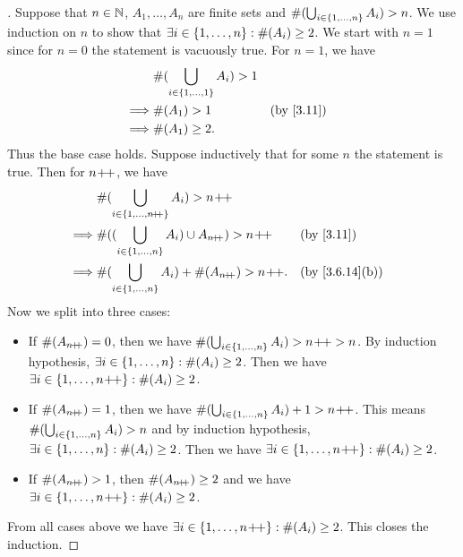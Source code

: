 \begin{proof}[]
	Suppose that \(n \in \mathbb{N}\), \(A_1, \dots, A_n\) are finite sets and \(\#(\bigcup_{i \in \left\lbrace1, \dots, n\right\rbrace} A_i) > n\).
	We use induction on \(n\) to show that \(\exists i \in \left\lbrace1, \dots, n\right\rbrace : \#(A_i) \geq 2\).
	We start with \(n = 1\) since for \(n = 0\) the statement is vacuously true.
	For \(n = 1\), we have
	\begin{align*}
		         & \#(\bigcup_{i \in \set{1, \dots, 1}} A_i) > 1                \\
		\implies & \#(A_1) > 1                                   &  & \by{3.11} \\
		\implies & \#(A_1) \geq 2.
	\end{align*}
	Thus the base case holds.
	Suppose inductively that for some \(n\) the statement is true.
	Then for \(n\!+\!\!+\), we have
	\begin{align*}
		         & \#(\bigcup_{i \in \set{1, \dots, n\pp}} A_i) > n\pp                                                \\
		\implies & \#((\bigcup_{i \in \set{1, \dots, n}} A_i) \cup A_{n\pp}) > n\pp &  & \by{3.11}                    \\
		\implies & \#(\bigcup_{i \in \set{1, \dots, n}} A_i) + \#(A_{n\pp}) > n\pp. &  & \text{(by \cref{3.6.14}(b))}
	\end{align*}
	Now we split into three cases:
	\begin{itemize}
		\item If \(\#(A_{n\!+\!\!+}) = 0\), then we have \(\#(\bigcup_{i \in \left\lbrace1, \dots, n\right\rbrace} A_i) > n\!+\!\!+ > n\).
		      By induction hypothesis, \(\exists i \in \left\lbrace1, \dots, n\right\rbrace : \#(A_i) \geq 2\).
		      Then we have \(\exists i \in \left\lbrace1, \dots, n\!+\!\!+\right\rbrace : \#(A_i) \geq 2\).
		\item If \(\#(A_{n\!+\!\!+}) = 1\), then we have \(\#(\bigcup_{i \in \left\lbrace1, \dots, n\right\rbrace} A_i) + 1 > n\!+\!\!+\).
		      This means \(\#(\bigcup_{i \in \left\lbrace1, \dots, n\right\rbrace} A_i) > n\) and by induction hypothesis, \(\exists i \in \left\lbrace1, \dots, n\right\rbrace : \#(A_i) \geq 2\).
		      Then we have \(\exists i \in \left\lbrace1, \dots, n\!+\!\!+\right\rbrace : \#(A_i) \geq 2\).
		\item If \(\#(A_{n\!+\!\!+}) > 1\), then \(\#(A_{n\!+\!\!+}) \geq 2\) and we have \(\exists i \in \left\lbrace1, \dots, n\!+\!\!+\right\rbrace : \#(A_i) \geq 2\).
	\end{itemize}
	From all cases above we have \(\exists i \in \left\lbrace1, \dots, n\!+\!\!+\right\rbrace : \#(A_i) \geq 2\).
	This closes the induction.
\end{proof}

